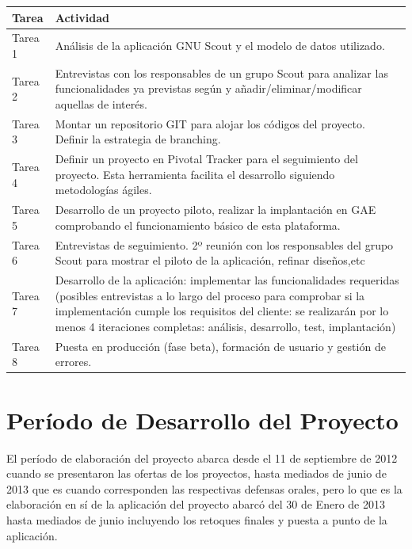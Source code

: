 \begin{tabular}{|p{25mm}|p{80mm}|} \hline 
\textbf{Tarea } & \textbf{Actividad} \\ \hline
Tarea 1 &
Análisis de la aplicación GNU Scout y el modelo de datos utilizado.
\\
\hline

Tarea 2 &
Entrevistas con los responsables de un grupo Scout para analizar las funcionalidades ya
previstas según y añadir/eliminar/modificar aquellas de interés.
\\
\hline

Tarea 3 &
Montar un repositorio GIT para alojar los códigos del proyecto. Definir la
estrategia de branching.
\\
\hline

Tarea 4 &
Definir un proyecto en Pivotal Tracker para el seguimiento del proyecto. Esta herramienta
facilita el desarrollo siguiendo metodologías ágiles.
\\
\hline

Tarea 5 & 
Desarrollo de un proyecto piloto, realizar la implantación en GAE comprobando el 
funcionamiento básico de esta plataforma.
\\
\hline

Tarea 6 &
Entrevistas de seguimiento. 2º reunión con los responsables del grupo Scout para
mostrar el piloto de la aplicación, refinar diseños,etc
\\
\hline

Tarea 7 &
Desarrollo de la aplicación: implementar las funcionalidades requeridas (posibles
entrevistas a lo largo del proceso para comprobar si la implementación cumple los requisitos
del cliente: se realizarán por lo menos 4 iteraciones completas: análisis, desarrollo, test, implantación)
\\
\hline

Tarea 8 &
Puesta en producción (fase beta), formación de usuario y gestión de errores.
\\
\hline

\end{tabular}


\section{Período de Desarrollo del Proyecto}
\label{1:sec:4}

El período de elaboración del proyecto abarca desde el 11 de septiembre de 2012 cuando se presentaron las ofertas de los proyectos, 
hasta mediados de junio de 2013 que es cuando corresponden las respectivas defensas orales, pero lo que es la elaboración en sí de la aplicación del proyecto
abarcó del 30 de Enero de 2013 hasta mediados de junio incluyendo los retoques finales y puesta a punto de la aplicación.\\

